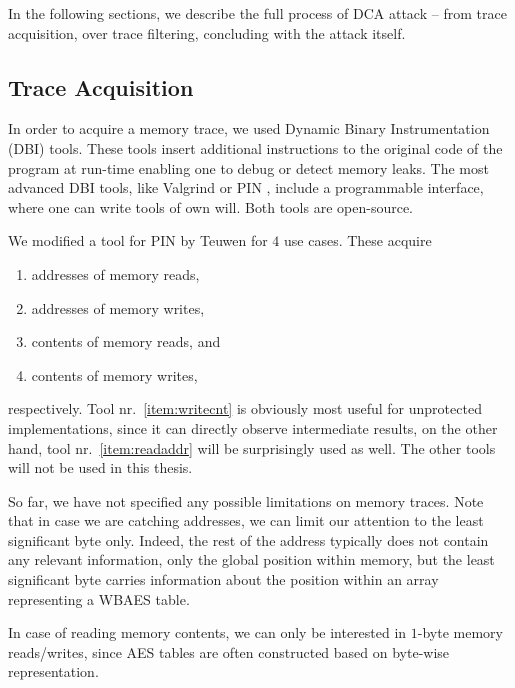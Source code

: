 In the following sections, we describe the full process of DCA attack -- from trace acquisition, over trace filtering, concluding with the attack itself.



\subsection{Trace Acquisition}
\label{sec:tracq}

In order to acquire a memory trace, we used Dynamic Binary Instrumentation (DBI) tools. These tools insert additional instructions to the original code of the program at run-time enabling one to debug or detect memory leaks. The most advanced DBI tools, like Valgrind \cite{nethercote2007valgrind} or PIN \cite{luk2005pin}, include a programmable interface, where one can write tools of own will. Both tools are open-source.

We modified a tool for PIN by Teuwen \cite{teuwen2015movfuscator} for $4$ use cases. These acquire
\begin{enumerate}
	\item addresses of memory reads, \label{item:readaddr}
	\item addresses of memory writes,
	\item contents of memory reads, and
	\item contents of memory writes, \label{item:writecnt}
\end{enumerate}
respectively. Tool nr.~\ref{item:writecnt} is obviously most useful for unprotected implementations, since it can directly observe intermediate results, on the other hand, tool nr.~\ref{item:readaddr} will be surprisingly used as well. The other tools will not be used in this thesis.

\begin{note}
\label{note:lsb}
	So far, we have not specified any possible limitations on memory traces. Note that in case we are catching addresses, we can limit our attention to the least significant byte only. Indeed, the rest of the address typically does not contain any relevant information, only the global position within memory, but the least significant byte carries information about the position within an array representing a WBAES table.
	
	In case of reading memory contents, we can only be interested in $1$-byte memory reads/writes, since AES tables are often constructed based on byte-wise representation.
\end{note}

